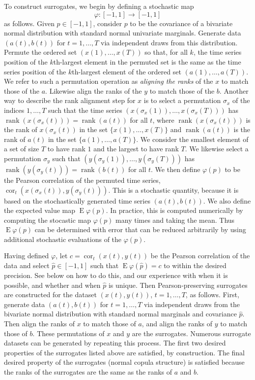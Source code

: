 \documentclass[letterpaper,12pt]{article}
\newcommand{\E}{\operatorname{E}}
\newcommand{\cor}{\operatorname{cor}}
\newcommand{\rank}{\operatorname{rank}}
\begin{document}
To construct surrogates, we begin by defining a stochastic map
$$\varphi:[-1,1]\rightarrow[-1,1]$$ as follows. Given $p \in [-1,1]$,
consider $p$ to be the covariance of a bivariate normal distribution
with standard normal univariate marginals. Generate data 
$(a(t),b(t))$ for $t=1,\ldots,T$ via independent draws 
from this distribution. Permute the ordered set $(x(1),\ldots,x(T))$
so that, for all $k$, the time series position of the $k$th-largest element
in the permuted set is the same as the time series position of the 
$k$th-largest element of the ordered set $(a(1),\ldots,a(T))$. We refer to
such a permutation operation as \emph{aligning the ranks} of the $x$
to match those of the $a$. Likewise align the ranks of the $y$
to match those of the $b$. Another way to describe the rank alignment 
step for $x$ is to select a permutation $\sigma_x$
of the indices $1,\dots,T$ such that the time series
$(x(\sigma_x(1)),\ldots,x(\sigma_x(T)))$ has 
$\rank(x(\sigma_x(t)))=\rank(a(t))$ for all $t$, where $\rank(x(\sigma_x(t)))$ is
the rank of $x(\sigma_x(t))$ in the set $\{x(1),\ldots,x(T)\}$ and 
$\rank(a(t))$ is the rank of $a(t)$ in the set $\{a(1),\ldots,a(T)\}$.
We consider the smallest element of a set of size $T$ to have rank $1$ and
the largest to have rank $T$. We likewise select a permutation $\sigma_y$
such that $(y(\sigma_y(1)),\ldots,y(\sigma_y(T)))$ has 
$\rank(y(\sigma_y(t)))=\rank(b(t))$ for all $t$. We then define $\varphi(p)$
to be the Pearson correlation of the permuted time series, 
$\cor_t(x(\sigma_x(t)),y(\sigma_y(t)))$. This is a 
stochastic quantity, because it is based on the stochastically generated
time series $(a(t),b(t))$. We also define the expected value map
$\E\varphi(p)$. In practice, this is computed numerically by computing
the stocastic map $\varphi(p)$ many times and taking the mean. Thus
$\E\varphi(p)$ can be determined with error that can be reduced 
arbitrarily by using additional stochastic evaluations of the $\varphi(p)$.

Having defined $\varphi$, let $c=\cor_t(x(t),y(t))$ be the Pearson 
correlation of the data and select $\hat{p} \in [-1,1]$ such that $\E\varphi(\hat{p})=c$ 
to within the desired precision. See below on how to do this, and our experience with
when it is possible, and whether and when $\hat{p}$ is unique. Then Pearson-preserving 
surrogates are constructed for
the dataset $(x(t),y(t))$, $t=1,\ldots,T$, as follows. First, generate data 
$(a(t),b(t))$ for $t=1,\ldots,T$ via independent draws from the bivariate normal
distribution with standard normal marginals and covariance $\hat{p}$.
Then align the ranks of $x$ to match those of $a$, and align the ranks
of $y$ to match those of $b$. These permutations of $x$ and $y$ are the surrogates.
Numerous surrogate datasets can be generated by repeating this process.
The first two desired properties of the surrogates listed above are 
satisfied, by construction. The final desired property of the surrogates
(normal copula structure) is satisfied because the ranks of the surrogates
are the same as the ranks of $a$ and $b$.
\end{document}
